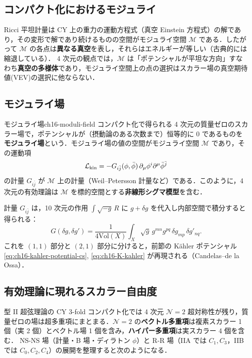 \subsection{コンパクト化におけるモジュライ}

Ricci 平坦計量は CY 上の重力の運動方程式（真空 Einstein 方程式）の解であり，その変形で解であり続けるものの空間がモジュライ空間 $\mathcal{M}$ である．したがって $\mathcal{M}$ の各点は\textbf{異なる真空}を表し，それらはエネルギーが等しい（古典的には縮退している）．
4 次元の観点では，$\mathcal{M}$ は「ポテンシャルが平坦な方向」すなわち\textbf{真空の多様体}であり，モジュライ空間上の点の選択はスカラー場の真空期待値(VEV)の選択に他ならない．

\subsection{モジュライ場}

\begin{mydef}{モジュライ場}{ch16-moduli-field}
コンパクト化で得られる 4 次元の質量ゼロのスカラー場で，ポテンシャルが（摂動論のある次数まで）恒等的に $0$ であるものを\textbf{モジュライ場}という．モジュライ場の値の空間がモジュライ空間 $\mathcal{M}$ であり，その運動項
\[
\mathcal{L}_{\rm kin}=-G_{i\bar j}(\phi,\bar\phi)\,\partial_\mu\phi^i\partial^\mu\bar\phi^{\bar j}
\]
の計量 $G_{i\bar j}$ が $\mathcal{M}$ 上の計量（Weil--Petersson 計量など）である．このように，4 次元の有効理論は $\mathcal{M}$ を標的空間とする\textbf{非線形シグマ模型}を含む．
\end{mydef}

計量 $G_{i\bar j}$ は，10 次元の作用 $\int\sqrt{-g}\,R$ に $g+\delta g$ を代入し内部空間で積分すると得られる：
\[
G(\delta g,\delta g')=\frac{1}{4\mathrm{Vol}(X)}\int_X\sqrt{g}\,g^{mn}g^{pq}\,\delta g_{mp}\,\delta g'_{nq} .
\]
これを $(1,1)$ 部分と $(2,1)$ 部分に分けると，前節の K\"ahler ポテンシャル \eqref{eq:ch16-kahler-potential-cs}, \eqref{eq:ch16-K-kahler} が再現される（Candelas--de la Ossa）．

\subsection{有効理論に現れるスカラー自由度}

型 II 超弦理論の CY 3-fold コンパクト化では 4 次元 $\mathcal{N}=2$ 超対称性が残り，質量ゼロの場は超多重項にまとまる．$\mathcal{N}=2$ の\textbf{ベクトル多重項}は複素スカラー 1 個（実 2 個）とベクトル場 1 個を含み，\textbf{ハイパー多重項}は実スカラー 4 個を含む．
NS-NS 場（計量・B 場・ディラトン $\phi$）と R-R 場（IIA では $C_1,C_3$，IIB では $C_0,C_2,C_4$）の展開を整理すると次のようになる．

